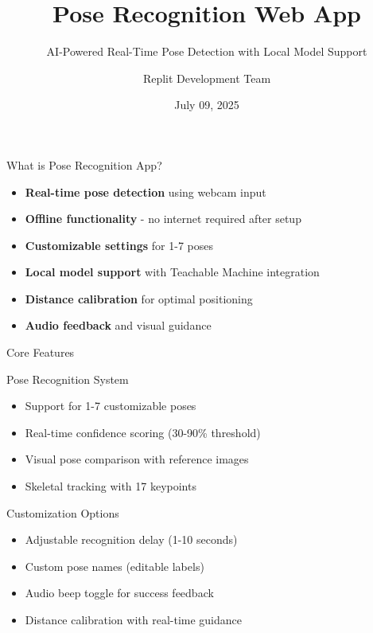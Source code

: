 \documentclass[11pt]{beamer}
\title{Pose Recognition Web App}
\subtitle{AI-Powered Real-Time Pose Detection with Local Model Support}
\author{Replit Development Team}
\date{July 09, 2025}
\begin{document}
\begin{frame}
    \titlepage
\end{frame}

\begin{frame}{What is Pose Recognition App?}
    \begin{itemize}
        \item \textbf{Real-time pose detection} using webcam input
        \item \textbf{Offline functionality} - no internet required after setup
        \item \textbf{Customizable settings} for 1-7 poses
        \item \textbf{Local model support} with Teachable Machine integration
        \item \textbf{Distance calibration} for optimal positioning
        \item \textbf{Audio feedback} and visual guidance
    \end{itemize}
\end{frame}

\begin{frame}{Core Features}
    \begin{block}{Pose Recognition System}
        \begin{itemize}
            \item Support for 1-7 customizable poses
            \item Real-time confidence scoring (30-90\% threshold)
            \item Visual pose comparison with reference images
            \item Skeletal tracking with 17 keypoints
        \end{itemize}
    \end{block}
    \begin{block}{Customization Options}
        \begin{itemize}
            \item Adjustable recognition delay (1-10 seconds)
            \item Custom pose names (editable labels)
            \item Audio beep toggle for success feedback
            \item Distance calibration with real-time guidance
        \end{itemize}
    \end{block}
\end{frame}
\end{document}
